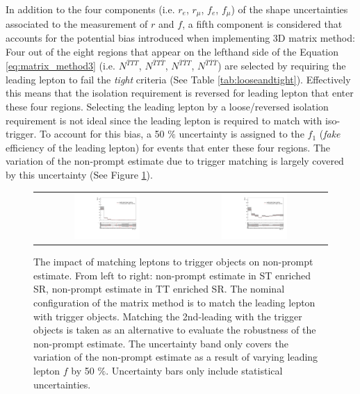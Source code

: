 In addition to the four components (i.e. $r_e$, $r_{\mu}$, $f_e$, $f_{\mu}$) of the shape uncertainties associated to the measurement of $r$ and $f$, a fifth component is considered that accounts for the potential bias introduced when implementing 3D matrix method: Four out of the eight regions that appear on the lefthand side of the Equation \ref{eq:matrix_method3} (i.e. $N^{\overline{T}TT}$, $N^{\overline{T}T\overline{T}}$, $N^{\overline{T}\overline{T}T}$, $N^{\overline{T}\overline{T}\overline{T}}$) are selected by requiring the leading lepton to fail the \emph{tight} criteria (See Table \ref{tab:looseandtight}). Effectively this means that the isolation requirement is reversed for leading lepton that enter these four regions. Selecting the leading lepton by a loose/reversed isolation requirement is not ideal since the leading lepton is required to match with iso-trigger. To account for this bias, a 50 $\%$ uncertainty is assigned to the $f_1$ (\emph{fake} efficiency of the leading lepton) for events that enter these four regions. The variation of the non-prompt estimate due to trigger matching is largely covered by this uncertainty (See Figure \ref{fig:MM_trigger}).

\begin{figure}[tbh!]
 \begin{center}
 \begin{tabular}{cc}
 \includegraphics[width=0.47\textwidth]{figures/Part3/Systematics/BDT_ST_MM}&
 \includegraphics[width=0.47\textwidth]{figures/Part3/Systematics/BDT_TT_MM} \\
 \end{tabular}
 \caption{The impact of matching leptons to trigger objects on non-prompt estimate. From left to right: non-prompt estimate in ST enriched SR, non-prompt estimate in TT enriched SR. The nominal configuration of the matrix method is to match the leading lepton with trigger objects. Matching the 2nd-leading with the trigger objects is taken as an alternative to evaluate the robustness of the non-prompt estimate. The uncertainty band only covers the variation of the non-prompt estimate as a result of varying leading lepton $f$ by 50 $\%$. Uncertainty bars only include statistical uncertainties.}
 \label{fig:MM_trigger}
 \end{center}
\end{figure}

